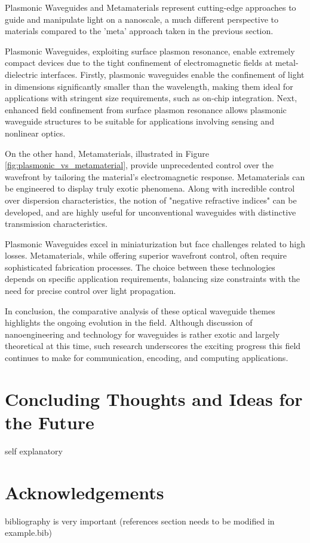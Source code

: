\documentclass[10pt]{article}
\begin{document}
Plasmonic Waveguides and Metamaterials represent cutting-edge approaches to guide and manipulate light on a nanoscale, a much different perspective to materials compared to the 'meta' approach taken in the previous section.

Plasmonic Waveguides, exploiting surface plasmon resonance, enable extremely compact devices due to the tight confinement of electromagnetic fields at metal-dielectric interfaces. 
Firstly, plasmonic waveguides enable the confinement of light in dimensions significantly smaller than the wavelength, making them ideal for applications with stringent size requirements, such as on-chip integration.
Next, enhanced field confinement from surface plasmon resonance allows plasmonic waveguide structures to be suitable for applications involving sensing and nonlinear optics.

On the other hand, Metamaterials, illustrated in Figure \ref{fig:plasmonic_vs_metamaterial}, provide unprecedented control over the wavefront by tailoring the material's electromagnetic response. 
Metamaterials can be engineered to display truly exotic phenomena. Along with incredible control over dispersion characteristics, the notion of "negative refractive indices" can be developed, and are highly 
useful for unconventional waveguides with distinctive transmission characteristics.



Plasmonic Waveguides excel in miniaturization but face challenges related to high losses. Metamaterials, while offering superior wavefront control, often require sophisticated fabrication processes. The choice between these technologies depends on specific application requirements, balancing size constraints with the need for precise control over light propagation.

In conclusion, the comparative analysis of these optical waveguide themes highlights the ongoing evolution in the field.
Although discussion of nanoengineering and technology for waveguides is rather exotic and largely theoretical at this time, 
such research underscores the exciting progress this field continues to make for communication, encoding, and computing applications.

\section{Concluding Thoughts and Ideas for the Future}

self explanatory 




\section{Acknowledgements}

bibliography is very important (references section needs to be modified in example.bib)


\end{document}
